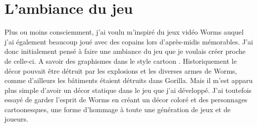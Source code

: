 \documentclass{tstextbook}
\begin{document}
\section{L’ambiance du jeu}
Plus ou moins consciemment, j'ai voulu m'inspiré du jeux vidéo Worms auquel j'ai également beaucoup joué avec des copains lors d'après-midis mémorables. J'ai donc initialement pensé à faire une ambiance du jeu que je voulais créer proche de celle-ci. A savoir des graphismes dans le style cartoon . Historiquement le décor pouvait être détruit par les explosions et les diverses armes de Worms, comme d'ailleurs les bâtiments étaient détruits dans Gorilla. Mais il m'est apparu plus simple d'avoir un décor statique dans le jeu que j'ai développé. J'ai toutefois essayé de garder l'esprit de Worms en créant un décor coloré et des personnages cartoonesques, une forme d'hommage à toute une génération de jeux et de joueurs.
\end{document}
